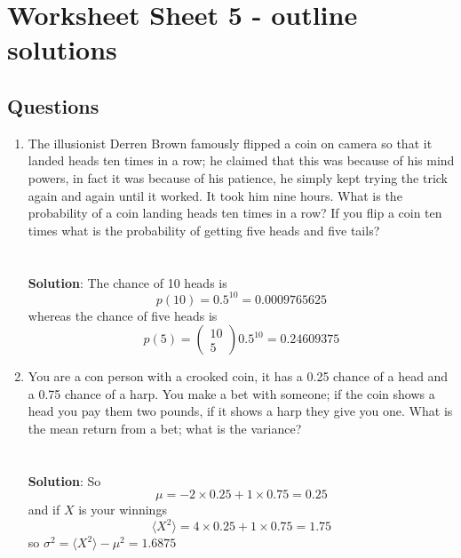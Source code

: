 \documentclass[11pt,a4paper]{scrartcl}
\begin{document}
\section*{Worksheet Sheet 5 - outline solutions}

\subsection*{Questions}

\begin{enumerate}


\item The illusionist Derren Brown famously flipped a coin on camera
  so that it landed heads ten times in a row; he claimed that this was
  because of his mind powers, in fact it was because of his patience,
  he simply kept trying the trick again and again until it
  worked. It took him nine hours. What is the probability of a coin landing heads ten times in
  a row? If you flip a coin ten times what is the probability of
  getting five heads and five tails?\\ \\ \\ \textbf{Solution}: The chance of 10 heads is
\begin{equation}
p(10)=0.5^{10}=0.0009765625
\end{equation}
whereas the chance of five heads is
\begin{equation}
p(5)=\left(\begin{array}{c}10\\5\end{array}\right)0.5^{10}=0.24609375
\end{equation}


\item You are a con person with a crooked coin, it has a 0.25 chance
  of a head and a 0.75 chance of a harp. You make a bet with someone; if
  the coin shows a head you pay them two pounds, if it shows a harp
  they give you one. What is the mean return from a bet; what is the variance?
\\ \\ \\
\textbf{Solution}: So 
\begin{equation}
\mu =-2\times 0.25 +1\times 0.75=0.25
\end{equation}
and if $X$ is your winnings
\begin{equation}
  \langle X^2\rangle=4\times 0.25 +1\times 0.75=1.75
\end{equation}
so $\sigma^2=\langle X^2\rangle-\mu^2=1.6875$
  

\end{enumerate}
\end{document}
